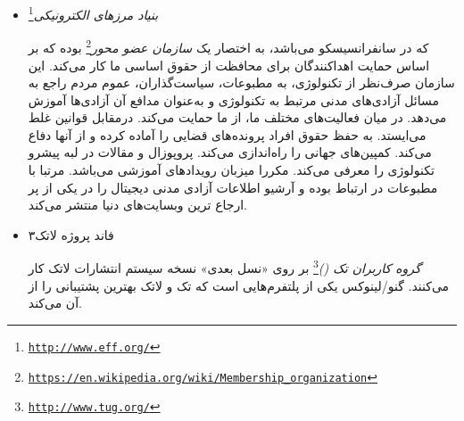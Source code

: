 \begin{itemize}
\item
\emph{بنیاد مرزهای الکترونیکی}\footnote{\texttt{\url{http://www.eff.org/}}}

که در سانفرانسیسکو می‌باشد، به اختصار  یک
\emph{سازمان عضو محور}\footnote{\texttt{\url{https://en.wikipedia.org/wiki/Membership_organization}}}
بوده که بر اساس حمایت اهداکنندگان برای محافظت از حقوق
اساسی ما کار می‌کند. این سازمان صرف‌نظر از تکنولوژی، به
مطبوعات، سیاست‌گذاران، عموم مردم راجع به مسائل آزادی‌های مدنی
مرتبط به تکنولوژی و به‌عنوان مدافع آن آزادی‌ها آموزش می‌دهد.
در میان فعالیت‌های مختلف ما،  از ما حمایت می‌کند.
درمقابل قوانین غلط می‌ایستد. به حفظ حقوق افراد پرونده‌های
قضایی را آماده کرده و از آنها دفاع می‌کند. کمپین‌های جهانی
را راه‌اندازی می‌کند. پروپوزال و مقالات در لبه پیشرو تکنولوژی
را معرفی می‌کند. مکررا میزبان رویدادهای آموزشی می‌باشد.
مرتبا با مطبوعات در ارتباط بوده و آرشیو اطلاعات آزادی مدنی
دیجیتال را در یکی از پر ارجاع ترین وبسایت‌های دنیا منتشر می‌کند.







\item
فاند پروژه لاتک۳

\emph{گروه کاربران تک ()}\footnote{\texttt{\url{http://www.tug.org/}}}
بر روی «نسل بعدی» نسخه سیستم انتشارات لاتک کار می‌کنند. گنو/لینوکس
یکی از پلتفرم‌هایی است که تک و لاتک بهترین پشتیبانی را از آن می‌کند.





\end{itemize}
